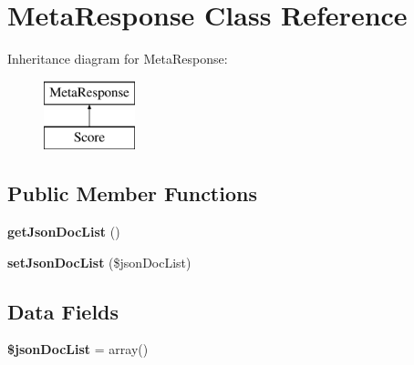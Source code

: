 \hypertarget{class_meta_response}{\section{Meta\+Response Class Reference}
\label{class_meta_response}
}
Inheritance diagram for Meta\+Response\+:\begin{figure}[H]
\begin{center}
\leavevmode
\includegraphics[height=2.000000cm]{class_meta_response}
\end{center}
\end{figure}
\subsection*{Public Member Functions}
\begin{DoxyCompactItemize}
\item 
\hypertarget{class_meta_response_a6900743273016ed1df50e4bd583e504d}{{\bfseries get\+Json\+Doc\+List} ()}\label{class_meta_response_a6900743273016ed1df50e4bd583e504d}

\item 
\hypertarget{class_meta_response_ae178908f40250667f1b8ad5336e3e57f}{{\bfseries set\+Json\+Doc\+List} (\$json\+Doc\+List)}\label{class_meta_response_ae178908f40250667f1b8ad5336e3e57f}

\end{DoxyCompactItemize}
\subsection*{Data Fields}
\begin{DoxyCompactItemize}
\item 
\hypertarget{class_meta_response_ab9a98366ccbf9919fd42389a1675b30d}{{\bfseries \$json\+Doc\+List} = array()}\label{class_meta_response_ab9a98366ccbf9919fd42389a1675b30d}

\end{DoxyCompactItemize}
